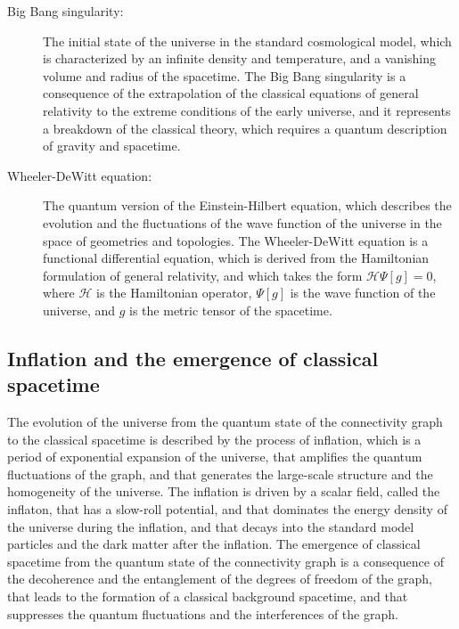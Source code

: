 \begin{tcolorbox}[colback=blue!5!white,colframe=blue!75!black,title=New terms]
\begin{description}
\item[Big Bang singularity:] The initial state of the universe in the standard cosmological model, which is characterized by an infinite density and temperature, and a vanishing volume and radius of the spacetime. The Big Bang singularity is a consequence of the extrapolation of the classical equations of general relativity to the extreme conditions of the early universe, and it represents a breakdown of the classical theory, which requires a quantum description of gravity and spacetime.
\item[Wheeler-DeWitt equation:] The quantum version of the Einstein-Hilbert equation, which describes the evolution and the fluctuations of the wave function of the universe in the space of geometries and topologies. The Wheeler-DeWitt equation is a functional differential equation, which is derived from the Hamiltonian formulation of general relativity, and which takes the form $\mathcal{H}\Psi[g] = 0$, where $\mathcal{H}$ is the Hamiltonian operator, $\Psi[g]$ is the wave function of the universe, and $g$ is the metric tensor of the spacetime.
\end{description}
\end{tcolorbox}

\subsection{Inflation and the emergence of classical spacetime}
The evolution of the universe from the quantum state of the connectivity graph to the classical spacetime is described by the process of inflation, which is a period of exponential expansion of the universe, that amplifies the quantum fluctuations of the graph, and that generates the large-scale structure and the homogeneity of the universe. The inflation is driven by a scalar field, called the inflaton, that has a slow-roll potential, and that dominates the energy density of the universe during the inflation, and that decays into the standard model particles and the dark matter after the inflation. The emergence of classical spacetime from the quantum state of the connectivity graph is a consequence of the decoherence and the entanglement of the degrees of freedom of the graph, that leads to the formation of a classical background spacetime, and that suppresses the quantum fluctuations and the interferences of the graph.

